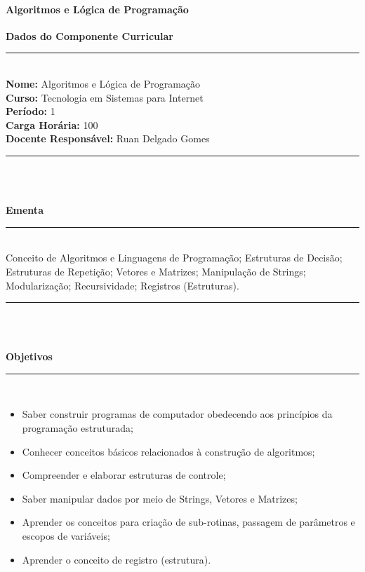 \paragraph{Algoritmos e L\'ogica de Programa\c{c}\~ao}

\begin{center}\textbf{Dados do Componente Curricular}\end{center}
\vspace{-5mm}
\noindent\rule{16.5cm}{0.4pt}
\\
\textbf{Nome:} Algoritmos e L\'ogica de Programa\c{c}\~ao
\\ 
\textbf{Curso:} Tecnologia em Sistemas para Internet
\\ 
\textbf{Período:} \unit{1}{\degree}
\\ 
\textbf{Carga Horária:} \unit{100}{\hour}
\\ 
\textbf{Docente Responsável:} Ruan Delgado Gomes
\\ 
\noindent\rule{16.5cm}{0.4pt}\\
\\
\vspace{-12mm}
\begin{center}\textbf{Ementa}\end{center}
\vspace{-5mm}
\noindent\rule{16.5cm}{0.4pt}
\\
Conceito de Algoritmos e Linguagens de Programação; Estruturas de Decisão; Estruturas de Repetição; Vetores e Matrizes; Manipulação de Strings; Modularização; Recursividade; Registros (Estruturas).\\
\noindent\rule{16.5cm}{0.4pt}\\
\\
\vspace{-12mm}
\begin{center}\textbf{Objetivos}\end{center}
\vspace{-5mm}
\noindent\rule{16.5cm}{0.4pt}
\\
\begin{itemize}
\item Saber construir programas de computador obedecendo aos princípios da programação estruturada;
\item Conhecer conceitos básicos relacionados à construção de algoritmos;
\item Compreender e elaborar estruturas de controle;
\item Saber manipular dados por meio de Strings, Vetores e Matrizes;
\item Aprender os conceitos para criação de sub-rotinas, passagem de parâmetros e escopos de variáveis;
\item Aprender o conceito de registro (estrutura).
\end{itemize} 
